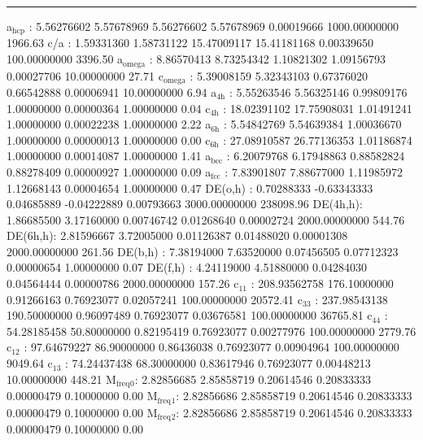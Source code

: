 \documentclass[11pt]{article}
\begin{document}
\noindent\rule{\textwidth}{0.5pt}
a\(_{\text{hcp}}\)   :   5.56276602   5.57678969   5.56276602   5.57678969   0.00019666 1000.00000000      1966.63
c/a     :   1.59331360   1.58731122  15.47009117  15.41181168   0.00339650 100.00000000      3396.50
a\(_{\text{omega}}\) :   8.86570413   8.73254342   1.10821302   1.09156793   0.00027706  10.00000000        27.71
c\(_{\text{omega}}\) :   5.39008159   5.32343103   0.67376020   0.66542888   0.00006941  10.00000000         6.94
a\(_{\text{4h}}\)    :   5.55263546   5.56325146   0.99809176   1.00000000   0.00000364   1.00000000         0.04
c\(_{\text{4h}}\)    :  18.02391102  17.75908031   1.01491241   1.00000000   0.00022238   1.00000000         2.22
a\(_{\text{6h}}\)    :   5.54842769   5.54639384   1.00036670   1.00000000   0.00000013   1.00000000         0.00
c\(_{\text{6h}}\)    :  27.08910587  26.77136353   1.01186874   1.00000000   0.00014087   1.00000000         1.41
a\(_{\text{bcc}}\)   :   6.20079768   6.17948863   0.88582824   0.88278409   0.00000927   1.00000000         0.09
a\(_{\text{fcc}}\)   :   7.83901807   7.88677000   1.11985972   1.12668143   0.00004654   1.00000000         0.47
DE(o,h) :   0.70288333  -0.63343333   0.04685889  -0.04222889   0.00793663 3000.00000000    238098.96
DE(4h,h):   1.86685500   3.17160000   0.00746742   0.01268640   0.00002724 2000.00000000       544.76
DE(6h,h):   2.81596667   3.72005000   0.01126387   0.01488020   0.00001308 2000.00000000       261.56
DE(b,h) :   7.38194000   7.63520000   0.07456505   0.07712323   0.00000654   1.00000000         0.07
DE(f,h) :   4.24119000   4.51880000   0.04284030   0.04564444   0.00000786 2000.00000000       157.26
c\(_{\text{11}}\)    : 208.93562758 176.10000000   0.91266163   0.76923077   0.02057241 100.00000000     20572.41
c\(_{\text{33}}\)    : 237.98543138 190.50000000   0.96097489   0.76923077   0.03676581 100.00000000     36765.81
c\(_{\text{44}}\)    :  54.28185458  50.80000000   0.82195419   0.76923077   0.00277976 100.00000000      2779.76
c\(_{\text{12}}\)    :  97.64679227  86.90000000   0.86436038   0.76923077   0.00904964 100.00000000      9049.64
c\(_{\text{13}}\)    :  74.24437438  68.30000000   0.83617946   0.76923077   0.00448213  10.00000000       448.21
M\(_{\text{freq}}\)\(_{\text{0}}\):   2.82856685   2.85858719   0.20614546   0.20833333   0.00000479   0.10000000         0.00
M\(_{\text{freq}}\)\(_{\text{1}}\):   2.82856686   2.85858719   0.20614546   0.20833333   0.00000479   0.10000000         0.00
M\(_{\text{freq}}\)\(_{\text{2}}\):   2.82856686   2.85858719   0.20614546   0.20833333   0.00000479   0.10000000         0.00
\end{document}
